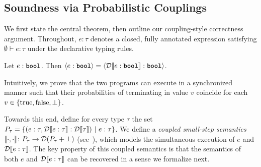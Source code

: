 \subsection{Soundness via Probabilistic Couplings}
\label{C}
%
We first state the central theorem, then outline our coupling-style correctness argument. Throughout, $e : \tau$ denotes a closed, fully annotated expression satisfying $\emptyset \vdash e : \tau$ under the declarative typing rules.
%
\begin{theorem}
	\label{thm:maintext:sound}
	Let $e:\textnormal{\ttfamily\bfseries bool}$. Then $\langle e:\textnormal{\ttfamily\bfseries bool} \rangle = \langle \mathcal{D}\llbracket e:\textnormal{\ttfamily\bfseries bool} \rrbracket : \textnormal{\ttfamily\bfseries bool} \rangle$.
\end{theorem}
%
Intuitively, we prove that the two programs can execute in a synchronized manner such that their probabilities of terminating in value $v$ coincide for each $v \in \{\textnormal{true},\textnormal{false},\bot\}$. %

Towards this end, define for every type $\tau$ the set $P_\tau = \{ (e:\tau, \mathcal{D}\llbracket e : \tau \rrbracket : \mathcal{D}\llbracket \tau \rrbracket) ~|~ e:\tau \}$. We define a \emph{coupled small-step semantics} $\llbracket \cdot,\cdot \rrbracket \colon P_\tau \to \mathcal{D}(P_\tau + \bot)$ (see~\cite[Tables~3 and~4]{Wu2026SliceExtended}), which models the simultaneous execution of $e$ and $\mathcal{D}\llbracket e:\tau \rrbracket$. The key property of this coupled semantics is that the semantics of both $e$ and $\mathcal{D}\llbracket e:\tau \rrbracket$ can be recovered in a sense we formalize next.

